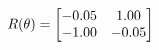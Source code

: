 \documentclass[preview]{standalone}
\begin{document}
\begin{align*}
\special{dvisvgm:raw <g id='unique000'>}R(\theta) = \begin{bmatrix}-0.05 & 1.00\\-1.00 & -0.05\end{bmatrix}\special{dvisvgm:raw </g>}
\end{align*}
\end{document}
